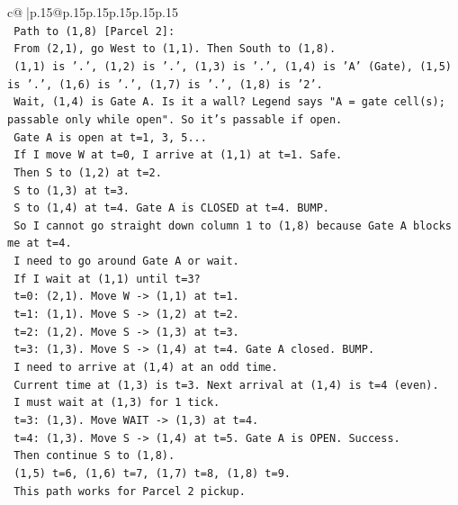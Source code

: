 \documentclass{article}
\begin{document}
{\begin{supertabular}{c@{$\;$}|p{.15\linewidth}@{}p{.15\linewidth}p{.15\linewidth}p{.15\linewidth}p{.15\linewidth}p{.15\linewidth}}
{{{\\ 
\texttt{    Path to (1,8) {[}Parcel 2{]}:} \\
\texttt{    From (2,1), go West to (1,1). Then South to (1,8).} \\
\texttt{    (1,1) is '.', (1,2) is '.', (1,3) is '.', (1,4) is 'A' (Gate), (1,5) is '.', (1,6) is '.', (1,7) is '.', (1,8) is '2'.} \\
\texttt{    Wait, (1,4) is Gate A. Is it a wall? Legend says "A = gate cell(s); passable only while open". So it's passable if open.} \\
\texttt{    Gate A is open at t=1, 3, 5...} \\
\texttt{    If I move W at t=0, I arrive at (1,1) at t=1. Safe.} \\
\texttt{    Then S to (1,2) at t=2.} \\
\texttt{    S to (1,3) at t=3.} \\
\texttt{    S to (1,4) at t=4. Gate A is CLOSED at t=4. BUMP.} \\
\texttt{    So I cannot go straight down column 1 to (1,8) because Gate A blocks me at t=4.} \\
\texttt{    I need to go around Gate A or wait.} \\
\texttt{    If I wait at (1,1) until t=3?} \\
\texttt{    t=0: (2,1). Move W {-}> (1,1) at t=1.} \\
\texttt{    t=1: (1,1). Move S {-}> (1,2) at t=2.} \\
\texttt{    t=2: (1,2). Move S {-}> (1,3) at t=3.} \\
\texttt{    t=3: (1,3). Move S {-}> (1,4) at t=4. Gate A closed. BUMP.} \\
\texttt{    I need to arrive at (1,4) at an odd time.} \\
\texttt{    Current time at (1,3) is t=3. Next arrival at (1,4) is t=4 (even).} \\
\texttt{    I must wait at (1,3) for 1 tick.} \\
\texttt{    t=3: (1,3). Move WAIT {-}> (1,3) at t=4.} \\
\texttt{    t=4: (1,3). Move S {-}> (1,4) at t=5. Gate A is OPEN. Success.} \\
\texttt{    Then continue S to (1,8).} \\
\texttt{    (1,5) t=6, (1,6) t=7, (1,7) t=8, (1,8) t=9.} \\
\texttt{    This path works for Parcel 2 pickup.} \\
\\ 
}}}
\end{supertabular}}
\end{document}
